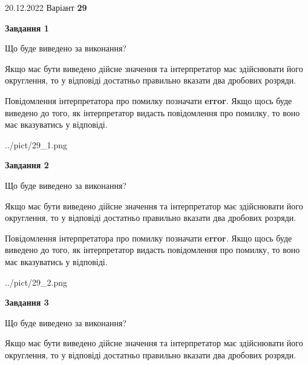 \documentclass[12pt, ukrainian]{article}
\begin{document}
{20.12.2022 Варіант \No \textbf { 29 }\par}
{
\begin {Large}

{\begin {center}\textbf{Завдання 1}\end {center}}\par
Що буде виведено за виконання? \par

Якщо має бути виведено дійсне значення та інтерпретатор має здійснювати його округлення, 
то у відповіді достатньо правильно вказати два дробових розряди.

Повідомлення інтерпретатора про помилку позначати \textbf{error}.
Якщо щось буде виведено до того, як інтерпретатор видасть повідомлення про помилку, 
то воно має вказуватись у відповіді. \par

\begin{center}
	{../pict/29_1.png}
\end{center}
\newpage

{\begin {center}\textbf{Завдання 2}\end {center}}\par
Що буде виведено за виконання? \par

Якщо має бути виведено дійсне значення та інтерпретатор має здійснювати його округлення, 
то у відповіді достатньо правильно вказати два дробових розряди.

Повідомлення інтерпретатора про помилку позначати \textbf{error}.
Якщо щось буде виведено до того, як інтерпретатор видасть повідомлення про помилку, 
то воно має вказуватись у відповіді. \par

\begin{center}
	{../pict/29_2.png}
\end{center}
\newpage

{\begin {center}\textbf{Завдання 3}\end {center}}\par
Що буде виведено за виконання? \par

Якщо має бути виведено дійсне значення та інтерпретатор має здійснювати його округлення, 
то у відповіді достатньо правильно вказати два дробових розряди.


\end{Large}}
\end{document}
